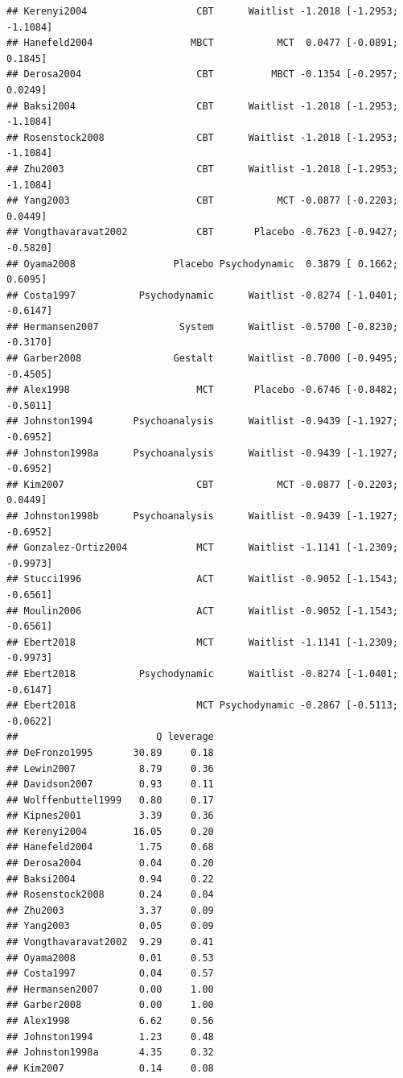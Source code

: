 \documentclass[]{book}
\begin{document}
\begin{verbatim}
## Kerenyi2004                   CBT      Waitlist -1.2018 [-1.2953; -1.1084]
## Hanefeld2004                 MBCT           MCT  0.0477 [-0.0891;  0.1845]
## Derosa2004                    CBT          MBCT -0.1354 [-0.2957;  0.0249]
## Baksi2004                     CBT      Waitlist -1.2018 [-1.2953; -1.1084]
## Rosenstock2008                CBT      Waitlist -1.2018 [-1.2953; -1.1084]
## Zhu2003                       CBT      Waitlist -1.2018 [-1.2953; -1.1084]
## Yang2003                      CBT           MCT -0.0877 [-0.2203;  0.0449]
## Vongthavaravat2002            CBT       Placebo -0.7623 [-0.9427; -0.5820]
## Oyama2008                 Placebo Psychodynamic  0.3879 [ 0.1662;  0.6095]
## Costa1997           Psychodynamic      Waitlist -0.8274 [-1.0401; -0.6147]
## Hermansen2007              System      Waitlist -0.5700 [-0.8230; -0.3170]
## Garber2008                Gestalt      Waitlist -0.7000 [-0.9495; -0.4505]
## Alex1998                      MCT       Placebo -0.6746 [-0.8482; -0.5011]
## Johnston1994       Psychoanalysis      Waitlist -0.9439 [-1.1927; -0.6952]
## Johnston1998a      Psychoanalysis      Waitlist -0.9439 [-1.1927; -0.6952]
## Kim2007                       CBT           MCT -0.0877 [-0.2203;  0.0449]
## Johnston1998b      Psychoanalysis      Waitlist -0.9439 [-1.1927; -0.6952]
## Gonzalez-Ortiz2004            MCT      Waitlist -1.1141 [-1.2309; -0.9973]
## Stucci1996                    ACT      Waitlist -0.9052 [-1.1543; -0.6561]
## Moulin2006                    ACT      Waitlist -0.9052 [-1.1543; -0.6561]
## Ebert2018                     MCT      Waitlist -1.1141 [-1.2309; -0.9973]
## Ebert2018           Psychodynamic      Waitlist -0.8274 [-1.0401; -0.6147]
## Ebert2018                     MCT Psychodynamic -0.2867 [-0.5113; -0.0622]
##                        Q leverage
## DeFronzo1995       30.89     0.18
## Lewin2007           8.79     0.36
## Davidson2007        0.93     0.11
## Wolffenbuttel1999   0.80     0.17
## Kipnes2001          3.39     0.36
## Kerenyi2004        16.05     0.20
## Hanefeld2004        1.75     0.68
## Derosa2004          0.04     0.20
## Baksi2004           0.94     0.22
## Rosenstock2008      0.24     0.04
## Zhu2003             3.37     0.09
## Yang2003            0.05     0.09
## Vongthavaravat2002  9.29     0.41
## Oyama2008           0.01     0.53
## Costa1997           0.04     0.57
## Hermansen2007       0.00     1.00
## Garber2008          0.00     1.00
## Alex1998            6.62     0.56
## Johnston1994        1.23     0.48
## Johnston1998a       4.35     0.32
## Kim2007             0.14     0.08

\end{verbatim}
\end{document}
